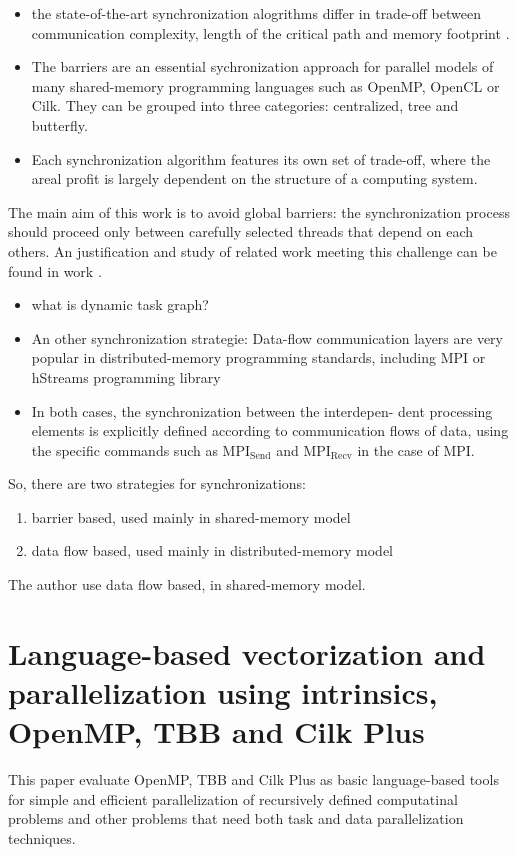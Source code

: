 \documentclass[11pt]{article}
\begin{document}
\begin{itemize}
\item the state-of-the-art synchronization alogrithms differ in trade-off between communication complexity, length of the critical path and memory footprint \cite{braeken17_effic_anony_authen_protoc_multip}.
\item The barriers are an essential sychronization approach for parallel models of many shared-memory programming languages such as OpenMP, OpenCL or Cilk. They can be grouped into three categories: centralized, tree and butterfly.
\item Each synchronization algorithm features its own set of trade-off, where the areal profit is largely dependent on the structure of a computing system.
\end{itemize}

The main aim of this work is to avoid global barriers: the synchronization process should proceed only between carefully selected threads that depend on each others. An justification and study of related work meeting this challenge can be found in work \cite{bhatti13_effic_synch_stenc_comput_using}.
\begin{itemize}
\item what is dynamic task graph?

\item An other synchronization strategie: Data-flow communication layers are very popular in distributed-memory programming standards, including MPI or hStreams programming library
\item In both cases, the synchronization between the interdepen- dent processing elements is explicitly defined according to communication flows of data, using the specific commands such as MPI$_{\text{Send}}$ and MPI$_{\text{Recv}}$ in the case of MPI.
\end{itemize}

So, there are two strategies for synchronizations:
\begin{enumerate}
\item barrier based, used mainly in shared-memory model
\item data flow based, used mainly in distributed-memory model
\end{enumerate}

The author use data flow based, in shared-memory model.

\section{Language-based vectorization and parallelization using intrinsics, OpenMP, TBB and Cilk Plus  \cite{stpiczyński18_languag_based_vector_paral_using}}
\label{sec-5}
This paper evaluate OpenMP, TBB and Cilk Plus as basic language-based tools for simple and efficient parallelization of recursively defined computatinal problems and other problems that need both task and data parallelization techniques.
\end{document}
